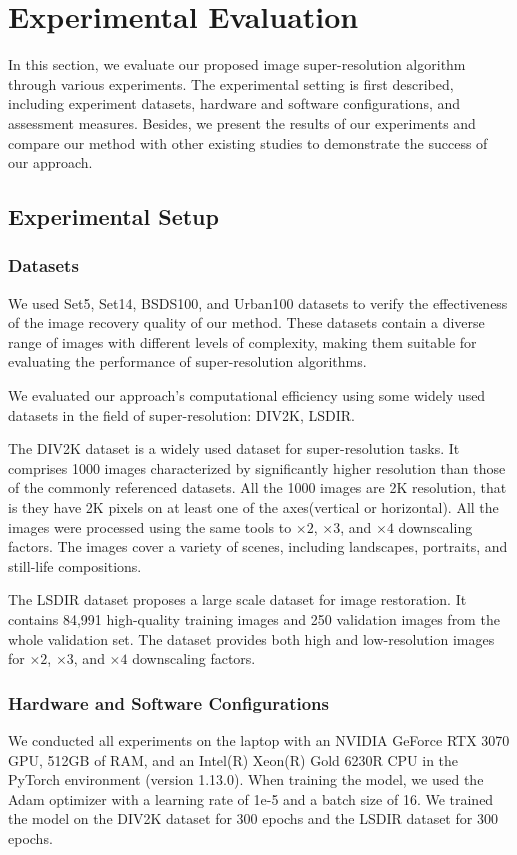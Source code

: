 \documentclass[10pt,twocolumn,letterpaper]{article}
\begin{document}
\section{Experimental Evaluation}
In this section, we evaluate our proposed image super-resolution algorithm through various experiments. The experimental setting is first described, including experiment datasets, hardware and software configurations, and assessment measures. Besides, we present the results of our experiments and compare our method with other existing studies to demonstrate the success of our approach.

\subsection{Experimental Setup}

\subsubsection{Datasets}
We used Set5, Set14, BSDS100, and Urban100 datasets to verify the effectiveness of the image recovery quality of our method. These datasets contain a diverse range of images with different levels of complexity, making them suitable for evaluating the performance of super-resolution algorithms.

We evaluated our approach's computational efficiency using some widely used datasets in the field of super-resolution: DIV2K\cite{div2k}, LSDIR\cite{lilsdir}.

The DIV2K dataset is a widely used dataset for super-resolution tasks. It comprises 1000 images characterized by significantly higher resolution than those of the commonly referenced datasets. All the 1000 images are 2K resolution, that is they have 2K pixels on at least one of the axes(vertical or horizontal). All the images were processed using the same tools to $\times2$, $\times3$, and $\times4$ downscaling factors. The images cover a variety of scenes, including landscapes, portraits, and still-life compositions.

The LSDIR dataset proposes a large scale dataset for image restoration. It contains 84,991 high-quality training images and 250 validation images from the whole validation set. The dataset provides both high and low-resolution images for $\times2$, $\times3$, and $\times4$ downscaling factors.


\subsubsection{Hardware and Software Configurations}
We conducted all experiments on the laptop with an NVIDIA GeForce RTX 3070 GPU, 512GB of RAM, and an Intel(R) Xeon(R) Gold 6230R CPU in the PyTorch environment (version 1.13.0). When training the model, we used the Adam optimizer with a learning rate of 1e-5 and a batch size of 16. We trained the model on the DIV2K dataset for 300 epochs and the LSDIR dataset for 300 epochs.
\end{document}
